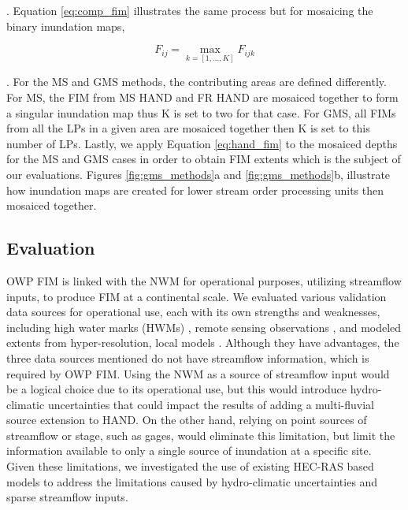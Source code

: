 \documentclass[draft]{dependencies/agujournal2019}
\begin{document}
%
. Equation \ref{eq:comp_fim} illustrates the same process but for mosaicing the binary inundation maps,
%
\begin{linenomath*}
\begin{equation}
\label{eq:comp_fim}
    F_{ij} = \max_{k=[1,...,K]} F_{ijk}
\end{equation}
\end{linenomath*}
. For the MS and GMS methods, the contributing areas are defined differently.
For MS, the FIM from MS HAND and FR HAND are mosaiced together to form a singular inundation map thus K is set to two for that case.
For GMS, all FIMs from all the LPs in a given area are mosaiced together then K is set to this number of LPs.
Lastly, we apply Equation \ref{eq:hand_fim} to the mosaiced depths for the MS and GMS cases in order to obtain FIM extents which is the subject of our evaluations.
Figures \ref{fig:gms_methods}a and \ref{fig:gms_methods}b, illustrate how inundation maps are created for lower stream order processing units then mosaiced together.
%
\subsection{Evaluation}
\label{ssec:evaluation}
%
OWP FIM is linked with the NWM for operational purposes, utilizing streamflow inputs, to produce FIM at a continental scale.
We evaluated various validation data sources for operational use, each with its own strengths and weaknesses, including high water marks (HWMs) \cite{musser2017characterization,watson2017characterization,breaker2016characterization}, remote sensing observations \cite{aristizabal2020high,aristizabal2021mapping}, and modeled extents from hyper-resolution, local models \cite{mcenery2005noaa}.
Although they have advantages, the three data sources mentioned do not have streamflow information, which is required by OWP FIM.
Using the NWM as a source of streamflow input would be a logical choice due to its operational use, but this would introduce hydro-climatic uncertainties that could impact the results of adding a multi-fluvial source extension to HAND.
On the other hand, relying on point sources of streamflow or stage, such as gages, would eliminate this limitation, but limit the information available to only a single source of inundation at a specific site.
Given these limitations, we investigated the use of existing HEC-RAS based models to address the limitations caused by hydro-climatic uncertainties and sparse streamflow inputs.
\end{document}
